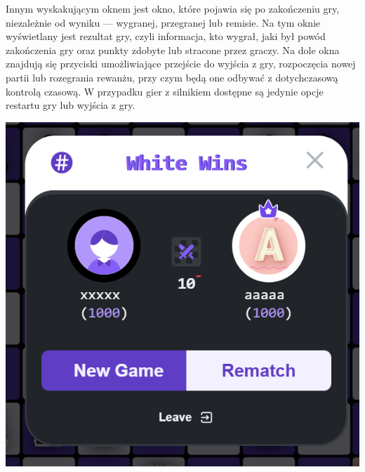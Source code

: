 \documentclass[12pt,a4paper]{article}
\begin{document}
\begin{minipage}[t]{0.45\textwidth} 
    \vspace{0pt} 
    \centering 
    Innym wyskakującym oknem jest okno, które pojawia się po zakończeniu gry, niezależnie od wyniku — wygranej, przegranej lub remisie. Na tym oknie wyświetlany jest rezultat gry, czyli informacja, kto wygrał, jaki był powód zakończenia gry oraz punkty zdobyte lub stracone przez graczy. Na dole okna znajdują się przyciski umożliwiające przejście do wyjścia z gry, rozpoczęcia nowej partii lub rozegrania rewanżu, przy czym będą one odbywać z dotychczasową kontrolą czasową. W przypadku gier z silnikiem dostępne są jedynie opcje restartu gry lub wyjścia z gry.
\end{minipage} 
\hfill 
\begin{minipage}[t]{0.45\textwidth} 
    \vspace{0pt} 
    \centering 
    \includegraphics[width=\linewidth]{zdj/ins_min_win.png} 
\end{minipage}

\newpage
\end{document}

